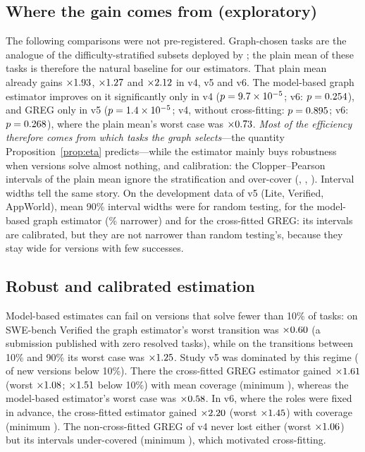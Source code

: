 \documentclass[11pt]{article}
\begin{document}
\subsection{Where the gain comes from (exploratory)}\label{sec:where}
The following comparisons were not pre-registered. Graph-chosen tasks are the analogue of the difficulty-stratified
subsets deployed by \citet{she2026production}; the plain mean of these tasks is therefore the natural baseline for our
estimators. That plain mean already gains $\times1.93$, $\times1.27$ and $\times2.12$ in v4,
v5 and v6. The model-based graph estimator improves on it significantly only in v4 ($p=9.7\times10^{-5}$; v6:
$p=0.254$), and GREG only in v5 ($p=1.4\times10^{-5}$; v4, without cross-fitting: $p=0.895$; v6:
$p=0.268$), where the
plain mean's worst case was $\times0.73$. \emph{Most of the efficiency therefore comes from which tasks the
graph selects}---the quantity Proposition~\ref{prop:eta} predicts---while the estimator mainly buys robustness when
versions solve almost nothing, and calibration: the Clopper--Pearson intervals of the plain mean ignore the
stratification and over-cover (\CovRstratFour, \CovRstratFive, \CovRstratSix). Interval widths tell the same story. On
the development data of v5 (Lite, Verified, AppWorld), mean 90\% interval widths were \WidthReset{} for random
testing, \WidthStrat{} for the model-based graph estimator (\WidthStratRed\% narrower) and \WidthGreg{} for the
cross-fitted GREG: its intervals are calibrated, but they are not narrower than random testing's, because they stay
wide for versions with few successes.

\subsection{Robust and calibrated estimation}\label{sec:robust}
Model-based estimates can fail on versions that solve fewer than 10\% of tasks: on SWE-bench Verified the graph
estimator's worst transition was $\times0.60$ (a submission published with zero resolved tasks), while on
the \ThreeMidN{} transitions between 10\% and 90\% its worst case was $\times1.25$. Study v5 was dominated by
this regime (\FiveLowN{} of \NFive{} new versions below 10\%). There the cross-fitted GREG estimator gained
$\times1.61$ (worst $\times1.08$; $\times1.51$ below 10\%) with mean coverage \CovGregFive{}
(minimum \CovGregMinFive), whereas the model-based estimator's worst case was $\times0.58$. In v6, where
the roles were fixed in advance, the cross-fitted estimator gained $\times2.20$ (worst $\times1.45$)
with coverage \CovGregSix{} (minimum \CovGregMinSix). The non-cross-fitted GREG of v4 never lost either (worst
$\times1.06$) but its intervals under-covered (minimum \CovGregMinFour), which motivated cross-fitting.
\end{document}
